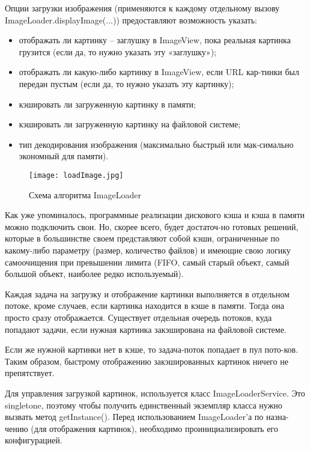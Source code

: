 Опции загрузки изображения (применяются к каждому отдельному вызову ImageLoader.displayImage(...)) предоставляют возможность указать:

\begin{itemize}	
	\item отображать ли картинку – заглушку в ImageView, пока реальная картинка грузится (если да, то нужно указать эту «заглушку»);
	\item отображать ли какую-либо картинку в ImageView, если URL кар-тинки был передан пустым (если да, то нужно указать эту картинку); 
	\item кэшировать ли загруженную картинку в памяти;
	\item кэшировать ли загруженную картинку на файловой системе;
	\item тип декодирования изображения (максимально быстрый или мак-симально экономный для памяти).
\end{itemize}


\begin{figure}[!htb]
			\centering
			\texttt{[image: loadImage.jpg]}
			\caption{ Схема алгоритма ImageLoader }
			\label{fig:arch_and_mod:ImageLoader}
\end{figure}

Как уже упоминалось, программные реализации дискового кэша и кэша в памяти можно подключить свои. Но, скорее всего, будет достаточ-но готовых решений, которые в большинстве своем представляют собой кэши, ограниченные по какому-либо параметру (размер, количество файлов) и имеющие свою логику самоочищения при превышении лимита (FIFO, самый старый объект, самый большой объект, наиболее редко используемый).


Каждая задача на загрузку и отображение картинки выполняется в отдельном потоке, кроме случаев, если картинка находится в кэше в памяти. Тогда она просто сразу отображается. Существует отдельная очередь потоков, куда попадают задачи, если нужная картинка закэширована на файловой системе. 

Если же нужной картинки нет в кэше, то задача-поток попадает в пул пото-ков. Таким образом, быстрому отображению закэшированных картинок ничего не препятствует.

Для управления загрузкой картинок, используется класс ImageLoaderService. Это singletone, поэтому чтобы получить единственный экземпляр класса нужно вызвать метод getInstance(). Перед использованием ImageLoader'а по назна-чению (для отображения картинок), необходимо проинициализировать его конфигурацией.

